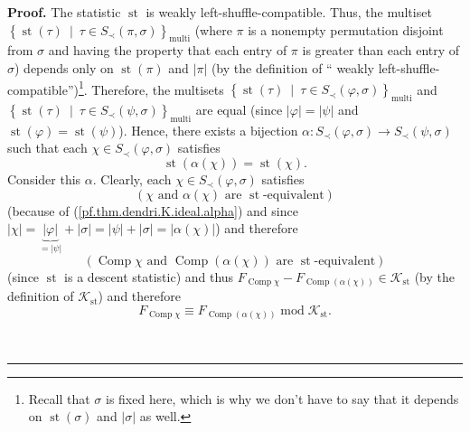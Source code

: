 \documentclass[numbers=enddot,12pt,final,onecolumn,notitlepage]{scrartcl}%
\theoremstyle{definition}
\newenvironment{proof}[1][Proof]{\noindent\textbf{#1.} }{\ \rule{0.5em}{0.5em}}
\newenvironment{verlong}{}{}
\begin{document}
\begin{verlong}
\begin{proof}
The statistic $\operatorname*{st}$ is weakly left-shuffle-compatible. Thus,
the multiset\newline$\left\{  \operatorname*{st}\left(  \tau\right)
\ \mid\ \tau\in S_{\prec}\left(  \pi,\sigma\right)  \right\}
_{\operatorname*{multi}}$ (where $\pi$ is a nonempty permutation disjoint from
$\sigma$ and having the property that each entry of $\pi$ is greater than each
entry of $\sigma$) depends only on $\operatorname*{st}\left(  \pi\right)  $
and $\left\vert \pi\right\vert $ (by the definition of \textquotedblleft
weakly left-shuffle-compatible\textquotedblright)\footnote{Recall that
$\sigma$ is fixed here, which is why we don't have to say that it depends on
$\operatorname*{st}\left(  \sigma\right)  $ and $\left\vert \sigma\right\vert
$ as well.}. Therefore, the multisets $\left\{  \operatorname*{st}\left(
\tau\right)  \ \mid\ \tau\in S_{\prec}\left(  \varphi,\sigma\right)  \right\}
_{\operatorname*{multi}}$ and \newline$\left\{  \operatorname*{st}\left(
\tau\right)  \ \mid\ \tau\in S_{\prec}\left(  \psi,\sigma\right)  \right\}
_{\operatorname*{multi}}$ are equal (since $\left\vert \varphi\right\vert
=\left\vert \psi\right\vert $ and $\operatorname*{st}\left(  \varphi\right)
=\operatorname*{st}\left(  \psi\right)  $). Hence, there exists a bijection
$\alpha:S_{\prec}\left(  \varphi,\sigma\right)  \rightarrow S_{\prec}\left(
\psi,\sigma\right)  $ such that each $\chi\in S_{\prec}\left(  \varphi
,\sigma\right)  $ satisfies%
\begin{equation}
\operatorname*{st}\left(  \alpha\left(  \chi\right)  \right)
=\operatorname*{st}\left(  \chi\right)  . \label{pf.thm.dendri.K.ideal.alpha}%
\end{equation}
Consider this $\alpha$. Clearly, each $\chi\in S_{\prec}\left(  \varphi
,\sigma\right)  $ satisfies%
\[
\left(  \chi\text{ and }\alpha\left(  \chi\right)  \text{ are }%
\operatorname*{st}\text{-equivalent}\right)
\]
(because of (\ref{pf.thm.dendri.K.ideal.alpha}) and since $\left\vert
\chi\right\vert =\underbrace{\left\vert \varphi\right\vert }_{=\left\vert
\psi\right\vert }+\left\vert \sigma\right\vert =\left\vert \psi\right\vert
+\left\vert \sigma\right\vert =\left\vert \alpha\left(  \chi\right)
\right\vert $) and therefore%
\[
\left(  \operatorname*{Comp}\chi\text{ and }\operatorname*{Comp}\left(
\alpha\left(  \chi\right)  \right)  \text{ are }\operatorname*{st}%
\text{-equivalent}\right)
\]
(since $\operatorname*{st}$ is a descent statistic) and thus
$F_{\operatorname*{Comp}\chi}-F_{\operatorname*{Comp}\left(  \alpha\left(
\chi\right)  \right)  }\in\mathcal{K}_{\operatorname*{st}}$ (by the definition
of $\mathcal{K}_{\operatorname*{st}}$) and therefore%
\begin{equation}
F_{\operatorname*{Comp}\chi}\equiv F_{\operatorname*{Comp}\left(
\alpha\left(  \chi\right)  \right)  }\operatorname{mod}\mathcal{K}%
_{\operatorname*{st}}. \label{pf.thm.dendri.K.ideal.alphaeq}%
\end{equation}



\end{proof}
\end{verlong}
\end{document}
